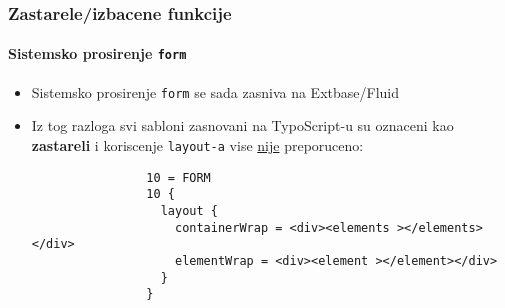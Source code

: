 \begin{frame}[fragile]
	\frametitle{Zastarele/izbacene funkcije}
	\framesubtitle{Sistemsko prosirenje \texttt{form}}

	\begin{itemize}

		\item Sistemsko prosirenje \texttt{form} se sada zasniva na Extbase/Fluid

		\item Iz tog razloga svi sabloni zasnovani na TypoScript-u su oznaceni kao 
			\textbf{zastareli} i koriscenje \texttt{layout-a} vise \underline{nije}
			preporuceno:

			\begin{lstlisting}
				10 = FORM
				10 {
				  layout {
				    containerWrap = <div><elements ></elements></div>
				    elementWrap = <div><element ></element></div>
				  }
				}
			\end{lstlisting}

	\end{itemize}

\end{frame}



